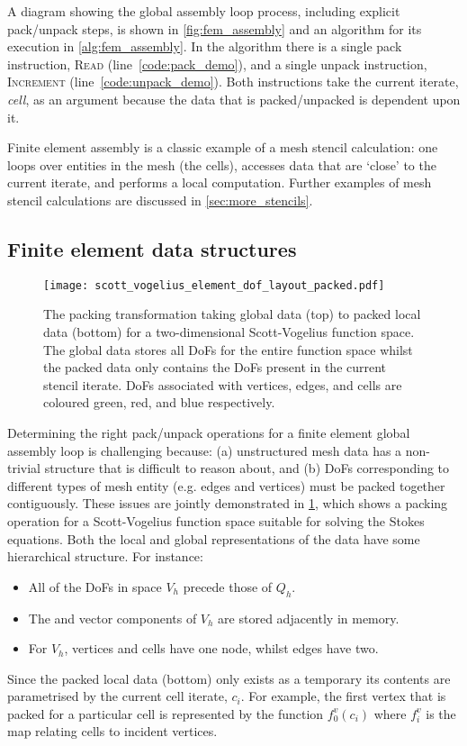 \documentclass[thesis]{subfiles}
\begin{document}
A diagram showing the global assembly loop process, including explicit pack/unpack steps, is shown in \cref{fig:fem_assembly} and an algorithm for its execution in \cref{alg:fem_assembly}.
In the algorithm there is a single pack instruction, \textsc{Read} (line~\ref{code:pack_demo}), and a single unpack instruction, \textsc{Increment} (line~\ref{code:unpack_demo}).
Both instructions take the current iterate, \textit{cell}, as an argument because the data that is packed/unpacked is dependent upon it.

Finite element assembly is a classic example of a mesh stencil calculation: one loops over entities in the mesh (the cells), accesses data that are `close' to the current iterate, and performs a local computation.
Further examples of mesh stencil calculations are discussed in \cref{sec:more_stencils}.

\subsection{Finite element data structures}

\begin{figure}
  \centering
  \texttt{[image: scott\_vogelius\_element\_dof\_layout\_packed.pdf]}
  \caption{
    The packing transformation taking global data (top) to packed local data (bottom) for a two-dimensional Scott-Vogelius function space.
    The global data stores all DoFs for the entire function space whilst the packed data only contains the DoFs present in the current stencil iterate.
    DoFs associated with vertices, edges, and cells are coloured green, red, and blue respectively.
  }
  \label{fig:scott_vogelius_element_dof_layout_packed}
\end{figure}

Determining the right pack/unpack operations for a finite element global assembly loop is challenging because:
(a) unstructured mesh data has a non-trivial structure that is difficult to reason about, and
(b) DoFs corresponding to different types of mesh entity (e.g. edges and vertices) must be packed together contiguously.
These issues are jointly demonstrated in \cref{fig:scott_vogelius_element_dof_layout_packed}, which shows a packing operation for a Scott-Vogelius function space suitable for solving the Stokes equations.
Both the local and global representations of the data have some hierarchical structure.
For instance:
\begin{itemize}
  \item All of the DoFs in space $V_h$ precede those of $Q_h$.
  \item The  and  vector components of $V_h$ are stored adjacently in memory.
  \item For $V_h$, vertices and cells have one node, whilst edges have two.
\end{itemize}
Since the packed local data (bottom) only exists as a temporary its contents are parametrised by the current cell iterate, $c_i$.
For example, the first vertex that is packed for a particular cell is represented by the function $f^v_0(c_i)$ where $f^v_i$ is the map relating cells to incident vertices.
\end{document}
